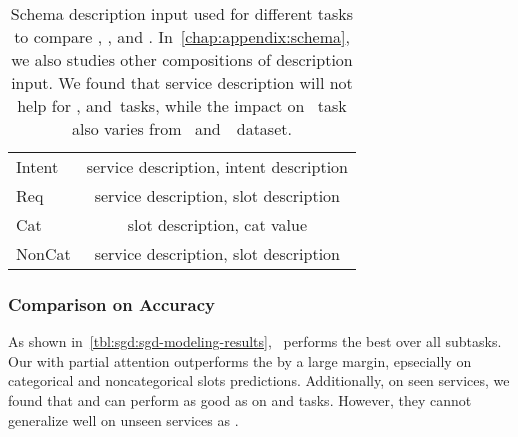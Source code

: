 \begin{table}[!t]
  \caption{\label{tbl:sgd:schema-seq} Schema description input used
    for different tasks to compare \DE, \CE, and \FE. In~\autoref{chap:appendix:schema}, we also studies other
    compositions of description input. We found that service
    description will not help for \IC, \RSI and~\CSL tasks, while the
    impact on \NSL~task also varies from
    \sgdst~and~\multiwoz~dataset.}
\begin{center}
\setlength{\tabcolsep}{3pt}
\begin{tabular}{l|c}
  \toprule
\hline
Intent & service description, intent description \\
Req    & service description, slot description   \\
Cat    & slot description, cat value             \\
NonCat & service description, slot description   \\
\hline
  \bottomrule
\end{tabular}
\end{center}
\end{table}


\subsubsection{Comparison on Accuracy}
\label{sssec:sgd:enc-results}
As shown in~\autoref{tbl:sgd:sgd-modeling-results},
\CE~performs the best over all subtasks. Our \FE with partial
attention outperforms the \DE by a large margin, epsecially on
categorical and noncategorical slots predictions. Additionally, on
seen services, we found that \DE and \FE can perform as good as \CE on
\IC and \RSI tasks. However, they cannot generalize well on unseen
services as \CE. %

